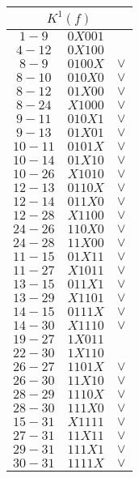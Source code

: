 \documentclass[12pt,a4paper]{report}
\begin{document}
\begin{tabular}{|ccc|}
    \hline
    \multicolumn{3}{|c|}{$K^1(f)$}\\
    \hline
    $1-9$ & $0X001$ & \\
    $4-12$ & $0X100$ & \\
    $8-9$ & $0100X$ & $\vee$\\
    $8-10$ & $010X0$ & $\vee$\\
    $8-12$ & $01X00$ & $\vee$\\
    $8-24$ & $X1000$ & $\vee$\\
    \hline
    $9-11$ & $010X1$ & $\vee$\\
    $9-13$ & $01X01$ & $\vee$\\
    $10-11$ & $0101X$ & $\vee$\\
    $10-14$ & $01X10$ & $\vee$\\
    $10-26$ & $X1010$ & $\vee$\\
    $12-13$ & $0110X$ & $\vee$\\
    $12-14$ & $011X0$ & $\vee$\\
    $12-28$ & $X1100$ & $\vee$\\
    $24-26$ & $110X0$ & $\vee$\\
    $24-28$ & $11X00$ & $\vee$\\
    \hline
    $11-15$ & $01X11$ & $\vee$\\
    $11-27$ & $X1011$ & $\vee$\\
    $13-15$ & $011X1$ & $\vee$\\
    $13-29$ & $X1101$ & $\vee$\\
    $14-15$ & $0111X$ & $\vee$\\
    $14-30$ & $X1110$ & $\vee$\\
    $19-27$ & $1X011$ & \\
    $22-30$ & $1X110$ & \\
    $26-27$ & $1101X$ & $\vee$\\
    $26-30$ & $11X10$ & $\vee$\\
    $28-29$ & $1110X$ & $\vee$\\
    $28-30$ & $111X0$ & $\vee$\\
    \hline
    $15-31$ & $X1111$ & $\vee$\\
    $27-31$ & $11X11$ & $\vee$\\
    $29-31$ & $111X1$ & $\vee$\\
    $30-31$ & $1111X$ & $\vee$\\
    \hline
\end{tabular}
\end{document}

